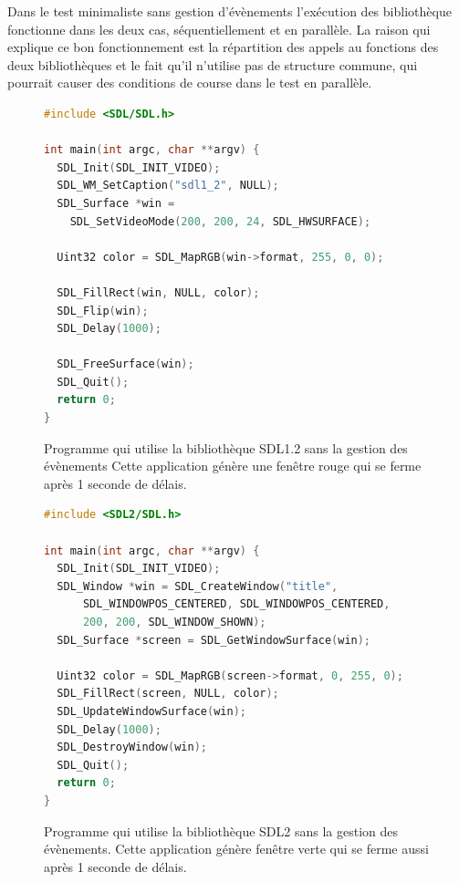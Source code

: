 \documentclass[12pt,initial,twoside,maitrise]{dms}
\numberwithin{equation}{section}
\numberwithin{table}{chapter}
\numberwithin{figure}{chapter}
\begin{document}

Dans le test minimaliste sans gestion d'évènements l'exécution des bibliothèque
fonctionne dans les deux cas, séquentiellement et en parallèle. La raison qui
explique ce bon fonctionnement est la répartition des appels au fonctions
des deux bibliothèques et le fait qu'il n'utilise pas de structure commune,
qui pourrait causer des conditions de course dans le test en parallèle.

\begin{center}
  \begin{figure}[ht]
\begin{lstlisting}[language=C,frame=single]
#include <SDL/SDL.h>

int main(int argc, char **argv) {
  SDL_Init(SDL_INIT_VIDEO);
  SDL_WM_SetCaption("sdl1_2", NULL);
  SDL_Surface *win =
    SDL_SetVideoMode(200, 200, 24, SDL_HWSURFACE);

  Uint32 color = SDL_MapRGB(win->format, 255, 0, 0);

  SDL_FillRect(win, NULL, color);
  SDL_Flip(win);
  SDL_Delay(1000);

  SDL_FreeSurface(win);
  SDL_Quit();
  return 0;
}
\end{lstlisting}
    \caption{Programme qui utilise la bibliothèque SDL1.2 sans la gestion des évènements
    Cette application génère une fenêtre rouge qui se ferme après 1 seconde de délais.}
  \end{figure}
\end{center}

\begin{center}
  \begin{figure}[ht]
\begin{lstlisting}[language=C,frame=single]
#include <SDL2/SDL.h>

int main(int argc, char **argv) {
  SDL_Init(SDL_INIT_VIDEO);
  SDL_Window *win = SDL_CreateWindow("title",
      SDL_WINDOWPOS_CENTERED, SDL_WINDOWPOS_CENTERED,
      200, 200, SDL_WINDOW_SHOWN);
  SDL_Surface *screen = SDL_GetWindowSurface(win);

  Uint32 color = SDL_MapRGB(screen->format, 0, 255, 0);
  SDL_FillRect(screen, NULL, color);
  SDL_UpdateWindowSurface(win);
  SDL_Delay(1000);
  SDL_DestroyWindow(win);
  SDL_Quit();
  return 0;
}
\end{lstlisting}
    \caption{Programme qui utilise la bibliothèque SDL2 sans la gestion des évènements.
    Cette application génère fenêtre verte qui se ferme aussi après 1 seconde de délais.}
  \end{figure}
\end{center}
\end{document}
